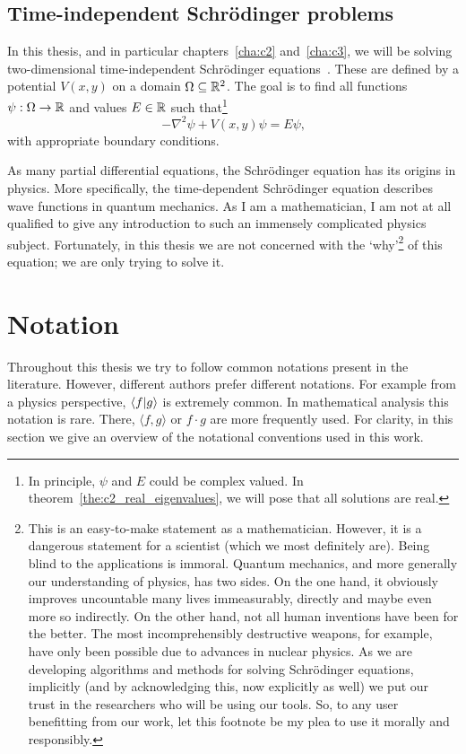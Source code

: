\subsection{Time-independent Schrödinger problems}

In this thesis, and in particular chapters~\ref{cha:c2} and~\ref{cha:c3}, we will be solving two-dimensional time-independent Schrödinger equations~\cite{schroedinger_quantisierung_1926}. These are defined by a potential $V(x, y)$ on a domain $\Omega \subseteq \mathbb{R}^2$. The goal is to find all functions $\psi : \Omega \to \mathbb{R}$ and values $E \in \mathbb{R}$ such that\footnote{In principle, $\psi$ and $E$ could be complex valued. In theorem~\ref{the:c2_real_eigenvalues}, we will pose that all solutions are real.}
$$
-\nabla^2\psi + V(x, y) \psi = E \psi\text{,}
$$
with appropriate boundary conditions.

As many partial differential equations, the Schrödinger equation has its origins in physics. More specifically, the time-dependent Schrödinger equation describes wave functions in quantum mechanics. As I am a mathematician, I am not at all qualified to give any introduction to such an immensely complicated physics subject. Fortunately, in this thesis we are not concerned with the `why'\footnote{This is an easy-to-make statement as a mathematician. However, it is a dangerous statement for a scientist (which we most definitely are). Being blind to the applications is immoral. Quantum mechanics, and more generally our understanding of physics, has two sides. On the one hand, it obviously improves uncountable many lives immeasurably, directly and maybe even more so indirectly. On the other hand, not all human inventions have been for the better. The most incomprehensibly destructive weapons, for example, have only been possible due to advances in nuclear physics. As we are developing algorithms and methods for solving Schrödinger equations, implicitly (and by acknowledging this, now explicitly as well) we put our trust in the researchers who will be using our tools. So, to any user benefitting from our work, let this footnote be my plea to use it morally and responsibly.} of this equation; we are only trying to solve it.

\section{Notation}

Throughout this thesis we try to follow common notations present in the literature. However, different authors prefer different notations. For example from a physics perspective, $\bra{f}\ket{g}$ is extremely common. In mathematical analysis this notation is rare. There, $\langle f, g \rangle$ or $f \cdot g$ are more frequently used. For clarity, in this section we give an overview of the notational conventions used in this work.

